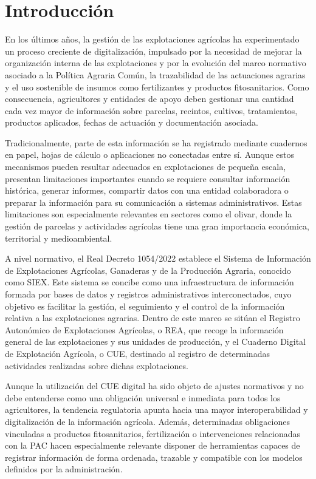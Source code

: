 \chapter{Introducción}\label{cap:introduccion}

En los últimos años, la gestión de las explotaciones agrícolas ha experimentado un proceso creciente de digitalización, impulsado por la necesidad de mejorar la organización interna de las
explotaciones y por la evolución del marco normativo asociado a la Política Agraria Común, la trazabilidad de las actuaciones agrarias y el uso sostenible de insumos como fertilizantes y
productos fitosanitarios. Como consecuencia, agricultores y entidades de apoyo deben gestionar una cantidad cada vez mayor de información sobre parcelas, recintos, cultivos, tratamientos,
productos aplicados, fechas de actuación y documentación asociada.

Tradicionalmente, parte de esta información se ha registrado mediante cuadernos en papel, hojas de cálculo o aplicaciones no conectadas entre sí. Aunque estos mecanismos pueden resultar
adecuados en explotaciones de pequeña escala, presentan limitaciones importantes cuando se requiere consultar información histórica, generar informes, compartir datos con una entidad
colaboradora o preparar la información para su comunicación a sistemas administrativos. Estas limitaciones son especialmente relevantes en sectores como el olivar, donde la gestión de
parcelas y actividades agrícolas tiene una gran importancia económica, territorial y medioambiental.

A nivel normativo, el Real Decreto 1054/2022 establece el Sistema de Información de Explotaciones Agrícolas, Ganaderas y de la Producción Agraria, conocido como SIEX. Este sistema se
concibe como una infraestructura de información formada por bases de datos y registros administrativos interconectados, cuyo objetivo es facilitar la gestión, el seguimiento y el control
de la información relativa a las explotaciones agrarias. Dentro de este marco se sitúan el Registro Autonómico de Explotaciones Agrícolas, o REA, que recoge la información general de las
explotaciones y sus unidades de producción, y el Cuaderno Digital de Explotación Agrícola, o CUE, destinado al registro de determinadas actividades realizadas sobre dichas explotaciones.

Aunque la utilización del CUE digital ha sido objeto de ajustes normativos y no debe entenderse como una obligación universal e inmediata para todos los agricultores, la tendencia regulatoria
apunta hacia una mayor interoperabilidad y digitalización de la información agrícola. Además, determinadas obligaciones vinculadas a productos fitosanitarios, fertilización o intervenciones
relacionadas con la PAC hacen especialmente relevante disponer de herramientas capaces de registrar información de forma ordenada, trazable y compatible con los modelos definidos por la
administración.


